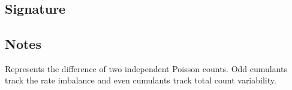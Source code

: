 \documentclass[letterpaper,10pt,english]{sphinxmanual}
\begin{document}
\section{}
\label{\detokenize{object_api_reference:skellam}}

\subsection{Signature}
\label{\detokenize{object_api_reference:id58}}
\begin{sphinxVerbatim}[commandchars=\\\{\}]

\end{sphinxVerbatim}


\subsection{Notes}
\label{\detokenize{object_api_reference:id59}}
\sphinxAtStartPar
Represents the difference of two independent Poisson counts. Odd cumulants track the rate imbalance and even cumulants track total count variability.
\end{document}
